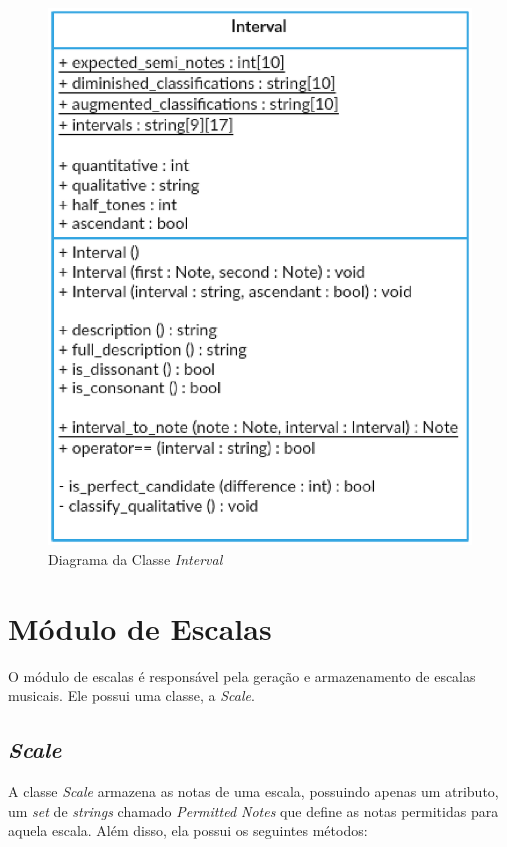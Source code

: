       \begin{figure}[htb]
        \centering
        \includegraphics[scale=0.7]{figuras/intervalclass.eps}
        \caption{Diagrama da Classe \textit{Interval}}
        \label{intervalclass}
      \end{figure}

  \section[Módulo de Escalas]{Módulo de Escalas}

    O módulo de escalas é responsável pela geração e armazenamento de escalas musicais. Ele possui uma classe, a \textit{Scale}.

    \subsection[\textit{Scale}]{\textit{Scale}}

    A classe \textit{Scale} armazena as notas de uma escala, possuindo apenas um atributo, um \textit{set} de \textit{strings} chamado \textit{Permitted Notes} que define as notas permitidas para aquela escala. Além disso, ela possui os seguintes métodos:

